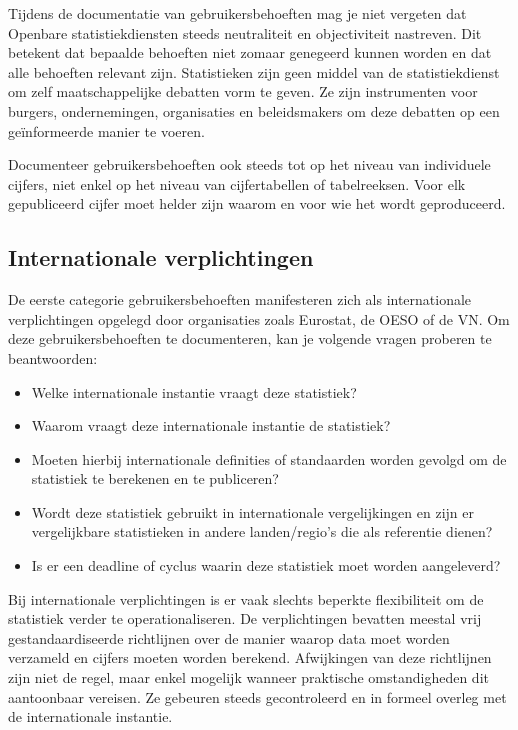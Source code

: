 \documentclass[\mainfiledir/00_handleiding_statistiekproductie.tex]{subfiles}
\begin{document}
Tijdens de documentatie van gebruikersbehoeften mag je niet vergeten dat Openbare statistiekdiensten steeds neutraliteit en objectiviteit nastreven. Dit betekent dat bepaalde behoeften niet zomaar genegeerd kunnen worden en dat alle behoeften relevant zijn. Statistieken zijn geen middel van de statistiekdienst om zelf maatschappelijke debatten vorm te geven. Ze zijn instrumenten voor burgers, ondernemingen, organisaties en beleidsmakers om deze debatten op een geïnformeerde manier te voeren.

Documenteer gebruikersbehoeften ook steeds tot op het niveau van individuele cijfers, niet enkel op het niveau van cijfertabellen of tabelreeksen. Voor elk gepubliceerd cijfer moet helder zijn waarom en voor wie het wordt geproduceerd.





\subsection{Internationale verplichtingen}

De eerste categorie gebruikersbehoeften manifesteren zich als internationale verplichtingen opgelegd door organisaties zoals Eurostat, de OESO of de VN. Om deze gebruikersbehoeften te documenteren, kan je volgende vragen proberen te beantwoorden:
\begin{itemize}[nosep]
    \item Welke internationale instantie vraagt deze statistiek? 
    \item Waarom vraagt deze internationale instantie de statistiek? 
    \item Moeten hierbij internationale definities of standaarden worden gevolgd om de statistiek te berekenen en te publiceren?
    \item Wordt deze statistiek gebruikt in internationale vergelijkingen en zijn er vergelijkbare statistieken in andere landen/regio’s die als referentie dienen?  
    \item Is er een deadline of cyclus waarin deze statistiek moet worden aangeleverd? 
\end{itemize}
Bij internationale verplichtingen is er vaak slechts beperkte flexibiliteit om de statistiek verder te operationaliseren. De verplichtingen bevatten meestal vrij gestandaardiseerde richtlijnen over de manier waarop data moet worden verzameld en cijfers moeten worden berekend. Afwijkingen van deze richtlijnen zijn niet de regel, maar enkel mogelijk wanneer praktische omstandigheden dit aantoonbaar vereisen. Ze gebeuren steeds gecontroleerd en in formeel overleg met de internationale instantie.
\end{document}
